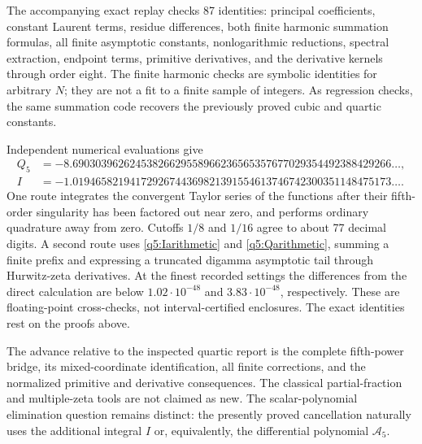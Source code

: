 The accompanying exact replay checks 87 identities: principal
coefficients, constant Laurent terms, residue differences, both finite
harmonic summation formulas, all finite asymptotic constants,
nonlogarithmic reductions, spectral extraction, endpoint terms,
primitive derivatives, and the derivative kernels through order eight.
The finite harmonic checks are symbolic identities for arbitrary $N$;
they are not a fit to a finite sample of integers.  As regression checks,
the same summation code recovers the previously proved cubic and
quartic constants.

Independent numerical evaluations give
\begin{align*}
 Q_5&=-8.69030396262453826629558966236565357677029354492388429266\ldots,\\
 I&=-1.01946582194172926744369821391554613746742300351148475173\ldots.
\end{align*}
One route integrates the convergent Taylor series of the functions
after their fifth-order singularity has been factored out near zero,
and performs ordinary quadrature away from zero.  Cutoffs $1/8$ and
$1/16$ agree to about 77 decimal digits.  A second route uses
\eqref{q5:Iarithmetic} and \eqref{q5:Qarithmetic}, summing a finite
prefix and expressing a truncated digamma asymptotic tail through
Hurwitz-zeta derivatives.  At the finest recorded settings the
differences from the direct calculation are below
$1.02\cdot10^{-48}$ and $3.83\cdot10^{-48}$, respectively.
These are floating-point cross-checks, not interval-certified
enclosures.  The exact identities rest on the proofs above.

The advance relative to the inspected quartic report is the complete
fifth-power bridge, its mixed-coordinate identification, all finite
corrections, and the normalized primitive and derivative consequences.
The classical partial-fraction and multiple-zeta tools are not claimed
as new.  The scalar-polynomial elimination question remains distinct:
the presently proved cancellation naturally uses the additional
integral $I$ or, equivalently, the differential polynomial
$\mathcal A_5$.
